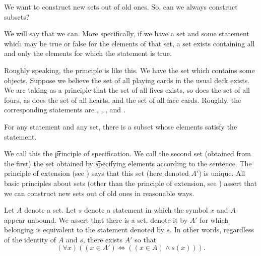 

We want to construct new sets out of old ones.
So, can we always construct subsets?


We will say that we can.
More specifically, if we have a set and some statement which may be true or false for the elements of that set, a set exists containing all and only the elements for which the statement is true.

Roughly speaking, the principle is like this.
We have the set which contains some objects.
Suppose we believe the set of all playing cards in the usual deck exists.
We are taking as a principle that the set of all fives exists, so does the set of all fours, as does the set of all hearts, and the set of all face cards.
Roughly, the corresponding statements are , , , and .

\begin{principle}[Specification]
	For any statement and any set, there is a subset whose elements satisfy the statement.
\end{principle}

We call this the \t{principle of specification}. 
We call the second set (obtained from the first) the set obtained by \t{specifying} elements according to the sentence.
The principle of extension (see ) says that this set (here denoted $A'$) is unique.
All  basic principles about sets (other than the principle of extension, see ) assert that we can construct new sets out of old ones in reasonable ways.

Let $A$ denote a set.
Let $s$ denote a statement in which the symbol $x$ and $A$ appear unbound.
We assert that there is a set, denote it by $A'$ for which belonging is equivalent to the statement denoted by $s$.
In other words, regardless of the identity of $A$ and $s$, there exists $A'$ so that
\[
	(\forall x)((x \in A') \iff ((x \in A) \land s(x))).
\]



